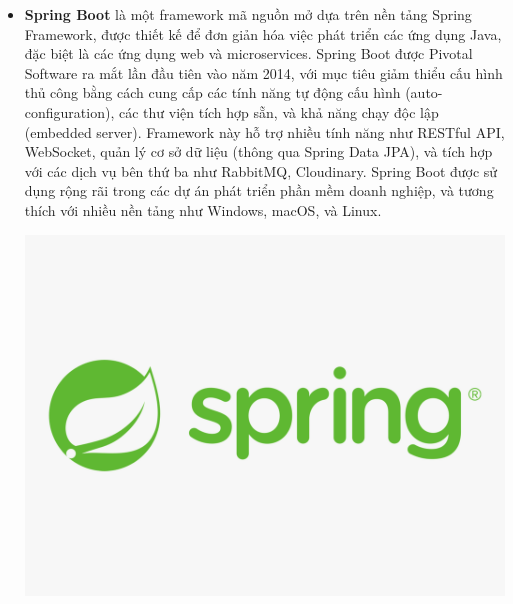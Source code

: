 \begin{itemize}
    \item \textbf{Spring Boot} là một framework mã nguồn mở dựa trên nền tảng Spring Framework, được thiết kế để đơn giản hóa việc phát triển các ứng dụng Java, đặc biệt là các ứng dụng web và microservices. Spring Boot được Pivotal Software ra mắt lần đầu tiên vào năm 2014, với mục tiêu giảm thiểu cấu hình thủ công bằng cách cung cấp các tính năng tự động cấu hình (auto-configuration), các thư viện tích hợp sẵn, và khả năng chạy độc lập (embedded server). Framework này hỗ trợ nhiều tính năng như RESTful API, WebSocket, quản lý cơ sở dữ liệu (thông qua Spring Data JPA), và tích hợp với các dịch vụ bên thứ ba như RabbitMQ, Cloudinary. Spring Boot được sử dụng rộng rãi trong các dự án phát triển phần mềm doanh nghiệp, và tương thích với nhiều nền tảng như Windows, macOS, và Linux.

    \includegraphics[width=\textwidth]{img/spring.png}
\end{itemize}


